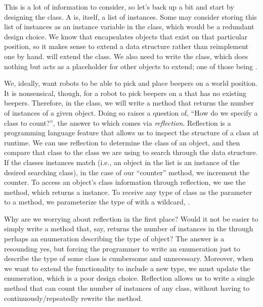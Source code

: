This is a lot of information to consider, so let's back up a bit and start by designing the  class. A  is, itself, a list of  instances. Some may consider storing this list of instances as an instance variable in the class, which would be a redundant design choice. We know that  encapsulates objects that exist on that particular position, so it makes sense to extend a data structure rather than reimplement one by hand.  will extend the  class. We also need to write the  class, which does nothing but acts as a placeholder for other objects to extend; one of those being .

We, ideally, want robots to be able to pick and place beepers on a world position. It is nonsensical, though, for a robot to pick beepers on a  that has no existing beepers. Therefore, in the  class, we will write a method that returns the number of instances of a given object. Doing so raises a question of, ``How do we specify a class to count?'', the answer to which comes via \textit{reflection}. Reflection is a programming language feature that allows us to inspect the structure of a class at runtime. We can use reflection to determine the class of an object, and then compare that class to the class we are using to search through the data structure. If the classes instances match (i.e., an object in the list is an instance of the desired searching class), in the case of our ``counter'' method, we increment the counter. To access an object's class information through reflection, we use the  method, which returns a  instance. To receive any type of class as the parameter to a method, we parameterize the type of  with a wildcard, .

Why are we worrying about reflection in the first place? Would it not be easier to simply write a method that, say, returns the number of  instances in the  through perhaps an enumeration describing the type of object? The answer is a resounding yes, but forcing the programmer to write an enumeration just to describe the type of some class is cumbersome and unnecessary. Moreover, when we want to extend the functionality to include a new type, we must update the enumeration, which is a poor design choice. Reflection allows us to write a single method that can count the number of instances of any class, without having to continuously/repeatedly rewrite the method.

